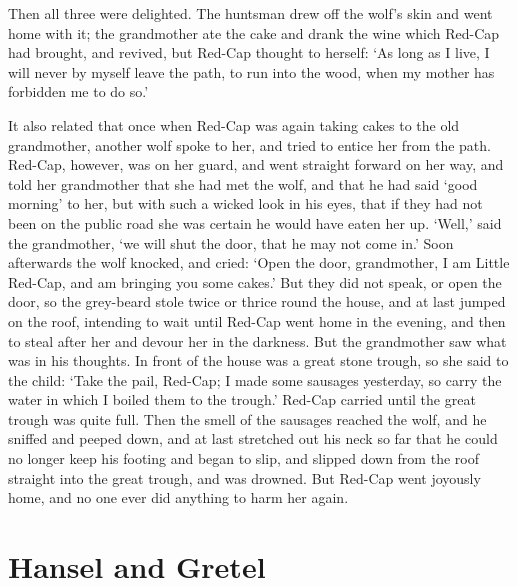 \documentclass[oneside,11pt]{memoir} %
\begin{document}
Then all three were delighted. The huntsman drew off the wolf's skin and went home with it; the grandmother ate the cake and drank the wine which Red-Cap had brought, and revived, but Red-Cap thought to herself: `As long as I live, I will never by myself leave the path, to run into the wood, when my mother has forbidden me to do so.'

It also related that once when Red-Cap was again taking cakes to the old grandmother, another wolf spoke to her, and tried to entice her from the path. Red-Cap, however, was on her guard, and went straight forward on her way, and told her grandmother that she had met the wolf, and that he had said `good morning' to her, but with such a wicked look in his eyes, that if they had not been on the public road she was certain he would have eaten her up. `Well,' said the grandmother, `we will shut the door, that he may not come in.' Soon afterwards the wolf knocked, and cried: `Open the door, grandmother, I am Little Red-Cap, and am bringing you some cakes.' But they did not speak, or open the door, so the grey-beard stole twice or thrice round the house, and at last jumped on the roof, intending to wait until Red-Cap went home in the evening, and then to steal after her and devour her in the darkness. But the grandmother saw what was in his thoughts. In front of the house was a great stone trough, so she said to the child: `Take the pail, Red-Cap; I made some sausages yesterday, so carry the water in which I boiled them to the trough.' Red-Cap carried until the great trough was quite full. Then the smell of the sausages reached the wolf, and he sniffed and peeped down, and at last stretched out his neck so far that he could no longer keep his footing and began to slip, and slipped down from the roof straight into the great trough, and was drowned. But Red-Cap went joyously home, and no one ever did anything to harm her again.


\chapter{Hansel and Gretel}
\end{document}
